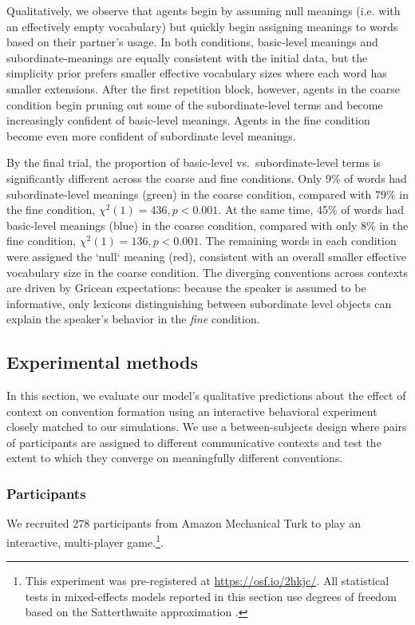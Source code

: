 Qualitatively, we observe that agents begin by assuming null meanings (i.e. with an effectively empty vocabulary) but quickly begin assigning meanings to words based on their partner's usage.
In both conditions, basic-level meanings and subordinate-meanings are equally consistent with the initial data, but the simplicity prior prefers smaller effective vocabulary sizes where each word has smaller extensions.
After the first repetition block, however, agents in the coarse condition begin pruning out some of the subordinate-level terms and become increasingly confident of basic-level meanings.
Agents in the fine condition become even more confident of subordinate level meanings.

By the final trial, the proportion of basic-level vs.~subordinate-level terms is significantly different across the coarse and fine conditions.
Only 9\% of words had subordinate-level meanings (green) in the coarse condition, compared with 79\% in the fine condition, $\chi^2(1) = 436, p < 0.001$.
At the same time, 45\% of words had basic-level meanings (blue) in the coarse condition, compared with only 8\% in the fine condition, $\chi^2(1) = 136, p < 0.001$.
The remaining words in each condition were assigned the `null` meaning (red), consistent with an overall smaller effective vocabulary size in the coarse condition.
The diverging conventions across contexts are driven by Gricean expectations: because the speaker is assumed to be informative, only lexicons distinguishing between subordinate level objects can explain the speaker's behavior in the \emph{fine} condition.

\subsection{Experimental methods}

In this section, we evaluate our model's qualitative predictions about the effect of context on convention formation using an interactive behavioral experiment closely matched to our simulations.
We use a between-subjects design where pairs of participants are assigned to different communicative contexts and test the extent to which they converge on meaningfully different conventions.

\subsubsection{Participants}

We recruited 278 participants from Amazon Mechanical Turk to play an interactive, multi-player game.\footnote{This experiment was pre-registered at \url{https://osf.io/2hkjc/}. All statistical tests in mixed-effects models reported in this section use degrees of freedom based on the Satterthwaite approximation \cite{luke2017evaluating}.}.

